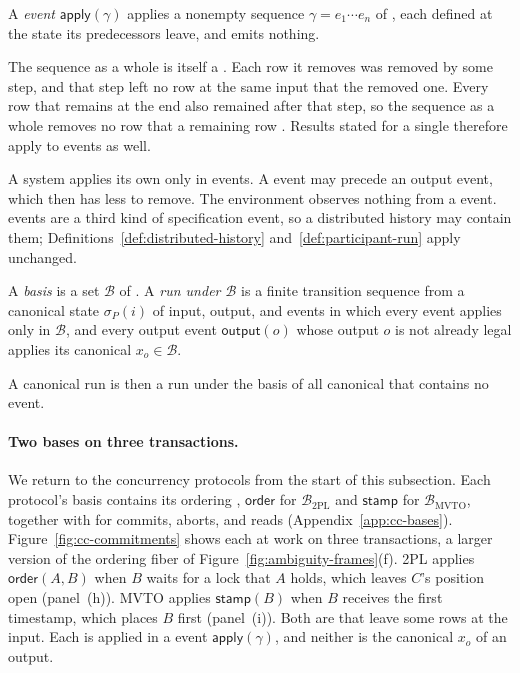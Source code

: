 \begin{definition}
\label{def:commitment-event}
A \emph{\commitment event} $\mathsf{apply}(\gamma)$ applies a nonempty
sequence $\gamma=e_1\cdots e_n$ of \commitments, each defined at the state
its predecessors leave, and emits nothing.
\end{definition}

The sequence as a whole is itself a \commitment.  Each row it removes was
removed by some step, and that step left no row at the same input that \outrel
the removed one.  Every row that remains at the end also remained after that
step, so the sequence as a whole removes no row that a remaining row \outrel.
Results stated for a single \commitment therefore apply to \commitment events
as well.

A system applies its own \commitments only in \commitment events.  A \commitment event may precede an output event, which then
has less to remove.  The environment observes nothing from a \commitment event.
\Commitment events are a third kind of specification event, so a distributed
history may contain them; Definitions~\ref{def:distributed-history} and~\ref{def:participant-run} apply
unchanged.

\begin{definition}
\label{def:commitment-basis}\label{def:run-under-basis}
A \emph{\commitment basis} is a set $\mathcal B$ of \commitments.  A \emph{run
under $\mathcal B$} is a finite transition sequence from a canonical state
$\sigma_P(i)$ of input, output, and \commitment events in which every
\commitment event applies only \commitments in $\mathcal B$, and every output
event $\mathsf{output}(o)$ whose output $o$ is not already legal applies its
canonical \commitment $x_o\in\mathcal B$.
\end{definition}

A canonical run is then a run under the basis of all canonical \commitments that
contains no \commitment event.

\paragraph{Two bases on three transactions.}
We return to the concurrency protocols from the start of this subsection.
Each protocol's basis contains its ordering \commitments, $\mathsf{order}$ for
$\mathcal B_{\mathrm{2PL}}$ and $\mathsf{stamp}$ for $\mathcal B_{\mathrm{MVTO}}$,
together with \commitments for commits, aborts, and reads
(Appendix~\ref{app:cc-bases}).  Figure~\ref{fig:cc-commitments} shows each at
work on three transactions, a larger version of the ordering fiber of
Figure~\ref{fig:ambiguity-frames}(f).  2PL applies $\mathsf{order}(A,B)$ when
$B$ waits for a lock that $A$ holds, which leaves $C$'s position open
(panel~(h)).  MVTO applies $\mathsf{stamp}(B)$ when $B$ receives the first
timestamp, which places $B$ first (panel~(i)).  Both are \commitments that
leave some rows at the input.  Each is applied in a \commitment event
$\mathsf{apply}(\gamma)$, and neither is the canonical \commitment $x_o$ of
an output.

